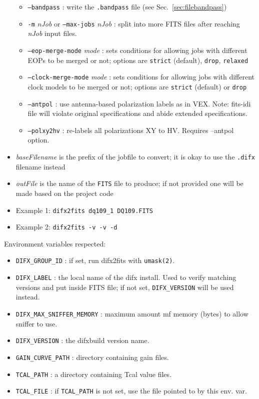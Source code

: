 \begin{itemize}
\begin{itemize}
\item[] {\tt --bandpass} : write the {\tt .bandpass} file (see Sec.~\ref{sec:filebandpass})
\item[] {\tt -m} {\em nJob} or {\tt --max-jobs} {\em nJob} : split into more FITS files after reaching {\em nJob} input files.
\item[] {\tt --eop-merge-mode} {\em mode} : sets conditions for allowing jobs with different EOPs to be merged or not; options are {\tt strict} (default), {\tt drop}, {\tt relaxed}
\item[] {\tt --clock-merge-mode} {\em mode} : sets conditions for allowing jobs with different clock models to be merged or not; options are {\tt strict} (default) or {\tt drop}
\item[] {\tt --antpol} : use antenna-based polarization labels as in VEX. Note: fits-idi file will violate original specifications and abide extended specifications.
\item[] {\tt --polxy2hv} : re-labels all polarizations XY to HV. Requires --antpol option. 
\end{itemize}
\item[] {\em baseFilename} is the prefix of the jobfile to convert; it is okay to use the {\tt .difx} filename instead
\item[] {\em outFile} is the name of the {\tt FITS} file to produce; if not provided one will be made based on the project code
\item[] Example 1: {\tt difx2fits dq109\_1 DQ109.FITS}
\item[] Example 2: {\tt difx2fits -v -v -d}
\end{itemize}

\noindent Environment variables respected:
\begin{itemize}
\item {\tt DIFX\_GROUP\_ID} : if set, run difx2fits with {\tt umask(2)}.
\item {\tt DIFX\_LABEL} : the local name of the difx install.  Used to verify matching versions and put inside FITS file; if not set, {\tt DIFX\_VERSION} will be used instead.
\item {\tt DIFX\_MAX\_SNIFFER\_MEMORY} : maximum amount mf memory (bytes) to allow sniffer to use.
\item {\tt DIFX\_VERSION} : the difxbuild version name.
\item {\tt GAIN\_CURVE\_PATH} : directory containing gain files.
\item {\tt TCAL\_PATH} : a directory containing Tcal value files.
\item {\tt TCAL\_FILE} : if {\tt TCAL\_PATH} is not set, use the file pointed to by this env. var.
\end{itemize}

